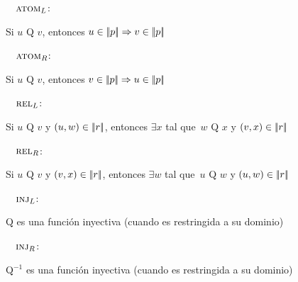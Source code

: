 \newcommand{\simdef}[2]{\noindent\ \ #1\hfill:\ \parbox[t]{.87\textwidth}{#2}\par}


\simdef{$\textsc{atom}_L$}{Si $u$ Q $v$, entonces $u \in |\!|p|\!| \Rightarrow v \in |\!|p|\!|$}
\simdef{$\textsc{atom}_R$}{Si $u$ Q $v$, entonces $v \in |\!|p|\!| \Rightarrow u \in |\!|p|\!|$}
\simdef{$\textsc{rel}_L$}{Si $u$ Q $v$ y $(u,w) \in |\!|r|\!|$, entonces $\exists x$ tal que\ $w$ Q $x$
  y $(v,x) \in |\!|r|\!|$}
\simdef{$\textsc{rel}_R$}{Si $u$ Q $v$ y $(v,x) \in |\!|r|\!|$, entonces $\exists w$ tal que\ $u$ Q $w$ y
 $(u,w) \in |\!|r|\!|$}
\simdef{$\textsc{inj}_L\space$}{Q es una funci\'on inyectiva (cuando es restringida a su dominio)}
\simdef{$\textsc{inj}_R\space$}{Q$^{-1}$ es una funci\'on inyectiva (cuando es restringida a su dominio)}
\smallskip




